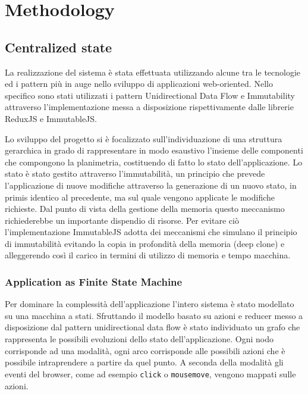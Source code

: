 \section{Methodology}

\subsection{Centralized state}
La realizzazione del sistema \`e stata effettuata utilizzando alcune tra le tecnologie ed i pattern pi\`u in auge nello sviluppo di applicazioni web-oriented. Nello specifico sono stati utilizzati i pattern Unidirectional Data Flow e Immutability attraverso l'implementazione messa a disposizione rispettivamente dalle librerie ReduxJS e ImmutableJS.


Lo sviluppo del progetto si \`e focalizzato sull'individuazione di una struttura gerarchica in grado di rappresentare in modo esaustivo l'insieme delle componenti che compongono la planimetria, costituendo di fatto lo stato dell'applicazione. Lo stato \`e stato gestito attraverso l'immutabilit\`a, un principio che prevede l'applicazione di nuove modifiche attraverso la generazione di un nuovo stato, in primis identico al precedente, ma sul quale vengono applicate le modifiche richieste. Dal punto di vista della gestione della memoria questo meccanismo richiederebbe un importante dispendio di risorse. Per evitare ci\`o l'implementazione ImmutableJS adotta dei meccanismi che simulano il principio di immutabilit\`a evitando la copia in profondit\`a della memoria  (deep clone) e alleggerendo cos\`i il carico in termini di utilizzo di memoria e tempo macchina.


\subsubsection{Application as Finite State Machine}\label{sec:fsm}
Per dominare la complessit\`a dell'applicazione l'intero sistema \`e stato modellato su una macchina a stati. Sfruttando il modello basato su azioni e reducer messo a disposizione dal pattern unidirectional data flow \`e stato individuato un grafo che rappresenta le possibili evoluzioni dello stato dell'applicazione. Ogni nodo corrisponde ad una modalit\`a, ogni arco corrisponde alle possibili azioni che è possibile intraprendere a partire da quel punto. A seconda della modalit\`a gli eventi del browser, come ad esempio \texttt{click} o \texttt{mousemove}, vengono mappati sulle azioni.

